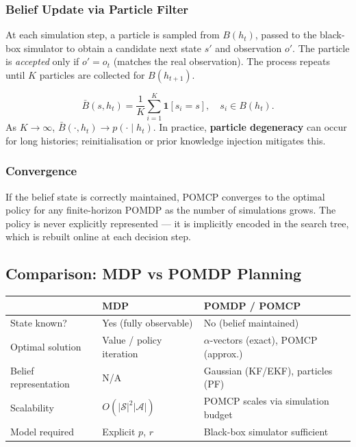 \documentclass[11pt,a4paper]{article}
\theoremstyle{definition}
\theoremstyle{plain}
\theoremstyle{remark}
\begin{document}
\subsubsection{Belief Update via Particle Filter}

At each simulation step, a particle is sampled from $B(h_t)$, passed to the black-box simulator to obtain a candidate next state $s'$ and observation $o'$. The particle is \emph{accepted} only if $o' = o_t$ (matches the real observation). The process repeats until $K$ particles are collected for $B(h_{t+1})$.

\begin{tcolorbox}[colback=blue!5!white,colframe=blue!75!black,title=\textbf{POMCP Belief Approximation}]
\[
    \bar{B}(s, h_t) = \frac{1}{K}\sum_{i=1}^{K} \mathbf{1}[s_i = s], \quad s_i \in B(h_t).
\]
As $K \to \infty$, $\bar{B}(\cdot, h_t) \to p(\cdot \mid h_t)$. In practice, \textbf{particle degeneracy} can occur for long histories; reinitialisation or prior knowledge injection mitigates this.
\end{tcolorbox}

\subsubsection{Convergence}

If the belief state is correctly maintained, POMCP converges to the optimal policy for any finite-horizon POMDP as the number of simulations grows. The policy is never explicitly represented — it is implicitly encoded in the search tree, which is rebuilt online at each decision step.

\subsection{Comparison: MDP vs POMDP Planning}

\begin{center}
\begin{tabular}{lll}
\hline
 & \textbf{MDP} & \textbf{POMDP / POMCP} \\
\hline
State known?         & Yes (fully observable)    & No (belief maintained) \\
Optimal solution     & Value / policy iteration  & $\alpha$-vectors (exact), POMCP (approx.) \\
Belief representation & N/A                      & Gaussian (KF/EKF), particles (PF) \\
Scalability          & $O(|\mathcal{S}|^2 |\mathcal{A}|)$ & POMCP scales via simulation budget \\
Model required       & Explicit $p$, $r$         & Black-box simulator sufficient \\
\hline
\end{tabular}
\end{center}
\end{document}
